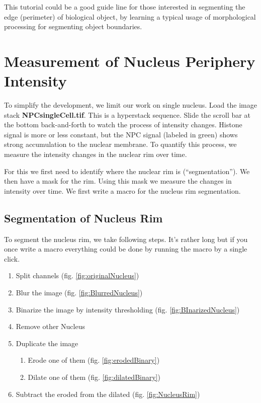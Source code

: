 \documentclass[11pt,a4paper,oneside]{report}
\begin{document}
This tutorial could be a good guide line for those interested in segmenting the edge (perimeter) of biological object, by learning a typical usage of morphological processing for segmenting object boundaries. 

\section{Measurement of Nucleus Periphery Intensity}

To simplify the development, we limit our work on single nucleus. Load the image stack \textbf{NPCsingleCell.tif}. This is a hyperstack sequence. Slide the scroll bar at the bottom back-and-forth to watch the process of intensity changes. Histone signal is more or less constant, but the NPC signal (labeled in green) shows strong accumulation to the nuclear membrane. To quantify this process, we measure the intensity changes in the nuclear rim over time.

For this we first need to identify where the nuclear rim is (``segmentation''). We then have a mask for the rim. Using this mask we measure the changes in intensity over time. We first write a macro for the nucleus rim segmentation. 

\subsection{Segmentation of Nucleus Rim}

To segment the nucleus rim, we take following steps. It's rather long but if you once write a macro everything could be done by running the macro by a single click. 

\begin{enumerate}
  \item Split channels (fig. \ref{fig:originalNucleus})
    \item Blur the image (fig. \ref{fig:BlurredNucleus})
    \item Binarize the image by intensity thresholding (fig. \ref{fig:BInarizedNucleus})
    \item Remove other Nucleus
    \item Duplicate the image
    \begin{enumerate}
        \item Erode one of them (fig. \ref{fig:erodedBinary})

        \item Dilate one of them (fig. \ref{fig:dilatedBinary})

    \end{enumerate}
    \item Subtract the eroded from the dilated (fig. \ref{fig:NucleusRim})

\end{enumerate}
\end{document}
